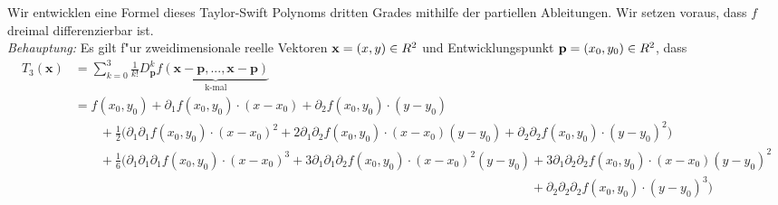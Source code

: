 \documentclass{article}
\newcommand{\R}{\mathbb{R}}
\begin{document}
Wir entwicklen eine Formel dieses Taylor-Swift Polynoms dritten Grades mithilfe der partiellen Ableitungen. Wir setzen voraus, dass $f$ dreimal differenzierbar ist.\\ 

\textit{Behauptung:} Es gilt  f"ur zweidimensionale reelle Vektoren $\mathbf x = (x,y) \in \mathbb \R^2$ und Entwicklungspunkt $\mathbf p = (x_0,y_0) \in \mathbb \R^2$, dass
\begin{align*}
    T_3(\mathbf x) 
    &= \sum^3_{k=0}\frac{1}{k!}D^k_{\mathbf p}f\underbrace{(\mathbf x-\mathbf p,...,\mathbf x- \mathbf p)}_{\text{k-mal}} \\
    &= f(x_0,y_0) + \partial_{1}f(x_0,y_0) \cdot (x-x_0) + \partial_{2}f(x_0,y_0) \cdot (y-y_0)\\
    &\qquad +\frac{1}{2}\Big( \partial_{1}\partial_{1}f(x_0,y_0) \cdot (x-x_0)^2 + 2\partial_{1}\partial_{2}f(x_0,y_0) \cdot (x-x_0)(y-y_0) + \partial_{2}\partial_{2}f(x_0,y_0) \cdot (y-y_0)^2 \Big ) \\
    &\qquad +\frac{1}{6}\Big( \partial_{1}\partial_{1}\partial_{1}f(x_0,y_0) \cdot (x-x_0)^3 + 3\partial_{1}\partial_{1}\partial_{2}f(x_0,y_0) \cdot (x-x_0)^2(y-y_0) + 3\partial_{1}\partial_{2}\partial_{2}f(x_0,y_0) \cdot (x-x_0)(y-y_0)^2 \\
    &\qquad \qquad \qquad\qquad \qquad \qquad\qquad \qquad \qquad\qquad \qquad \qquad\qquad \qquad \qquad\qquad \qquad \qquad +  \partial_{2}\partial_{2}\partial_{2}f(x_0,y_0) \cdot (y-y_0)^3 \Big )
\end{align*}
\end{document}
